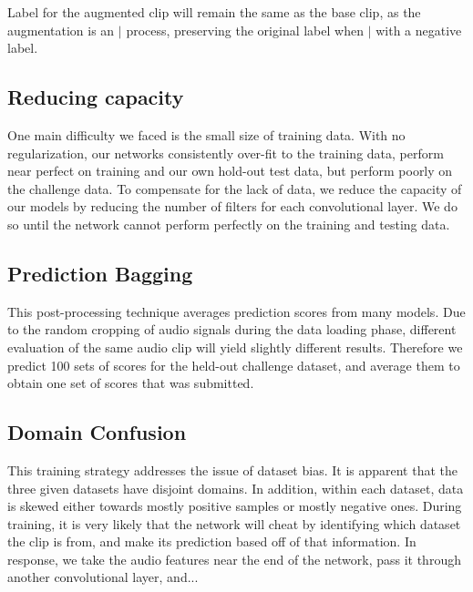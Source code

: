 \documentclass[10pt,twocolumn,letterpaper]{article}
\begin{document}
Label for the augmented clip will remain the same as the base clip, as the
augmentation is an \(|\) process, preserving the original label when \(|\)
with a negative label.

\subsection{Reducing capacity}

One main difficulty we faced is the small size of training data. With no
regularization, our networks consistently over-fit to the training data,
perform near perfect on training and our own hold-out test data, but
perform poorly on the challenge data. To compensate for the lack of data,
we reduce the capacity of our models by reducing the number of filters for
each convolutional layer. We do so until the network cannot perform
perfectly on the training and testing data.

\subsection{Prediction Bagging}

This post-processing technique averages prediction scores from many models.
Due to the random cropping of audio signals during the data loading phase,
different evaluation of the same audio clip will yield slightly different
results. Therefore we predict 100 sets of scores for the held-out challenge
dataset, and average them to obtain one set of scores that was submitted.

\subsection{Domain Confusion}


This training strategy addresses the issue of dataset bias. It is apparent
that the three given datasets have disjoint domains. In addition, within
each dataset, data is skewed either towards mostly positive samples or
mostly negative ones. During training, it is very likely that the network
will cheat by identifying which dataset the clip is from, and make its
prediction based off of that information. In response, we take the audio
features near the end of the network, pass it through another convolutional
layer, and... 
\end{document}
